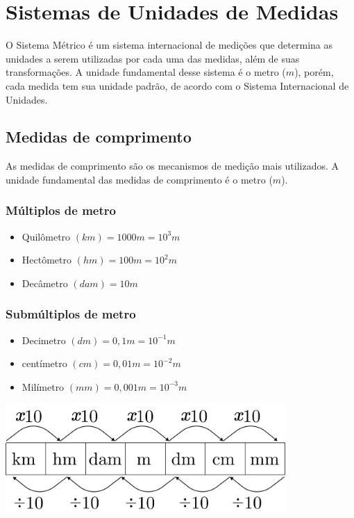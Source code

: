 \chapter{Sistemas de Unidades de Medidas}
O Sistema Métrico é um sistema internacional de medições que determina as unidades a serem utilizadas por cada uma das medidas, além de suas transformações. A unidade fundamental desse sistema é o metro ($m$), porém, cada medida tem sua unidade padrão, de acordo com o Sistema Internacional de Unidades.

\section{Medidas de comprimento}
As medidas de comprimento são os mecanismos de medição mais utilizados. A unidade fundamental das medidas de comprimento é o metro ($m$). 
\begin{multicols}{2}
	\subsection{Múltiplos de metro}
		\begin{itemize}
			\item Quilômetro $(km) = 1000m = 10^3m$
			\item Hectômetro $(hm) = 100m = 10^2m$
			\item Decâmetro $(dam) = 10m$ 
			
		\end{itemize}

	\subsection{Submúltiplos de metro}
		\begin{itemize}
			\item Decimetro $(dm) = 0,1m = 10^{-1}m$
			\item centímetro $(cm) = 0,01m = 10^{-2}m$
			\item Milímetro $(mm) = 0,001m = 10^{-3}m$
		\end{itemize}
\columnbreak
     \bigskip
     \noindent   %
     \begin{minipage}{\linewidth}
            \centering 
            \includegraphics[width=0.8\textwidth]{imagens/matematicaBasica/sistemaDeUnidades/MultiplosDeMetro.pdf}
             \label{figura:MultiplosDeMetro}
     \end{minipage}
   \end{multicols}


